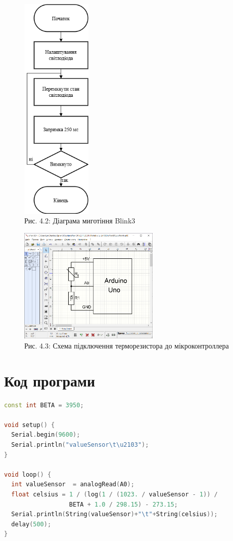 \documentclass[a4paper]{article}
\begin{document}
\begin{figure}[h]
    \centering
    \includegraphics[width=0.3\textwidth]{imgs/LW4.0.2.drawio.png}
    \caption*{Рис. 4.2: Діаграма миготіння Blink3}
\end{figure} 

\newpage 


\begin{figure}[h]
    \centering
    \includegraphics[width=0.6\textwidth]{imgs/LW4.1.png}
    \caption*{Рис. 4.3: Схема підключення терморезистора до мікроконтроллера}
\end{figure} 

\section*{Код програми}
\begin{lstlisting}[language=C++, caption=Програма для вимірювання температури]
const int BETA = 3950;

void setup() {
  Serial.begin(9600);
  Serial.println("valueSensor\t\u2103");
}

void loop() {
  int valueSensor  = analogRead(A0);
  float celsius = 1 / (log(1 / (1023. / valueSensor - 1)) /
                  BETA + 1.0 / 298.15) - 273.15;
  Serial.println(String(valueSensor)+"\t"+String(celsius));
  delay(500);
}
\end{lstlisting}
\end{document}
